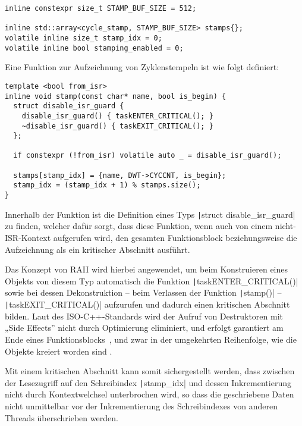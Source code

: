 \begin{code}
\begin{verbatim}
inline constexpr size_t STAMP_BUF_SIZE = 512;

inline std::array<cycle_stamp, STAMP_BUF_SIZE> stamps{};
volatile inline size_t stamp_idx = 0;
volatile inline bool stamping_enabled = 0;
\end{verbatim}
\end{code}

Eine Funktion zur Aufzeichnung von Zyklenstempeln ist wie folgt definiert:

\begin{code}
\begin{verbatim}
template <bool from_isr>
inline void stamp(const char* name, bool is_begin) {
  struct disable_isr_guard {
    disable_isr_guard() { taskENTER_CRITICAL(); }
    ~disable_isr_guard() { taskEXIT_CRITICAL(); }
  };

  if constexpr (!from_isr) volatile auto _ = disable_isr_guard();

  stamps[stamp_idx] = {name, DWT->CYCCNT, is_begin};
  stamp_idx = (stamp_idx + 1) % stamps.size();
}
\end{verbatim}
\end{code}

Innerhalb der Funktion ist die Definition eines Typs \texttt|struct
disable_isr_guard| zu finden, welcher dafür sorgt, dass diese Funktion, wenn
auch von einem nicht-ISR-Kontext aufgerufen wird, den gesamten Funktionsblock
beziehungsweise die Aufzeichnung als ein kritischer Abschnitt ausführt.

Das Konzept von \ac{RAII} wird hierbei angewendet, um beim Konstruieren eines
Objekts von diesem Typ automatisch die Funktion
\texttt|taskENTER_CRITICAL()| sowie bei dessen Dekonstruktion – beim
Verlassen der Funktion \texttt|stamp()| –
\texttt|taskEXIT_CRITICAL()| aufzurufen und dadurch einen kritischen
Abschnitt bilden. Laut des ISO-C++-Standards wird der Aufruf von Destruktoren
mit „Side Effects” nicht durch Optimierung eliminiert, und erfolgt garantiert am
Ende eines Funktionsblocks~\cite[§ 6.7.5.4 Abs. 3]{iso_iec_14882_2020}, und zwar
in der umgekehrten Reihenfolge, wie die Objekte kreiert worden sind
\cite{isocpp_dtor_order}.

Mit einem kritischen Abschnitt kann somit sichergestellt werden, dass zwischen
der Lesezugriff auf den Schreibindex \texttt|stamp_idx| und dessen
Inkrementierung nicht durch Kontextwelchsel unterbrochen wird, so dass die
geschriebene Daten nicht unmittelbar vor der Inkrementierung des Schreibindexes
von anderen Threads überschrieben werden.

